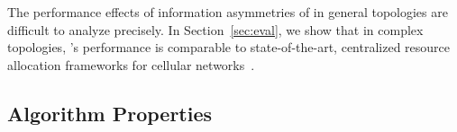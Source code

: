 The performance effects of information asymmetries of \cf in general topologies are difficult to analyze precisely. 
In Section~\ref{sec:eval},
we show that in complex topologies, \cf's performance is comparable to state-of-the-art, centralized resource allocation frameworks for cellular networks~\cite{fermi}.



\subsection{Algorithm Properties}
\label{sec:proof}


